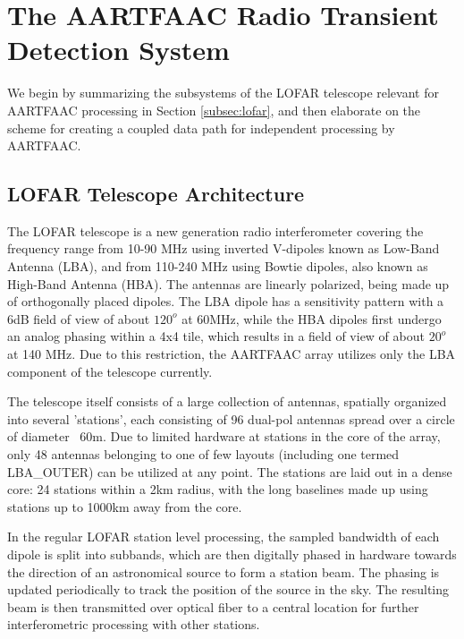 \documentclass{ws-jai}
\begin{document}
\section {\label{sec:aartfaac_array}The AARTFAAC Radio Transient Detection System}
We  begin by  summarizing the  subsystems of  the LOFAR  telescope relevant  for
AARTFAAC processing  in Section  \ref{subsec:lofar}, and  then elaborate  on the
scheme for creating a coupled data path for independent processing by AARTFAAC.

\subsection {\label{subsec:lofar} LOFAR Telescope Architecture}
The   LOFAR   telescope  \citep{van2013lofar}   is   a   new  generation   radio
interferometer  covering  the frequency  range  from  10-90 MHz  using  inverted
V-dipoles known  as Low-Band Antenna  (LBA), and  from 110-240 MHz  using Bowtie
dipoles,  also known  as High-Band  Antenna  (HBA).  The  antennas are  linearly
polarized, being made  up of orthogonally placed dipoles.  The  LBA dipole has a
sensitivity pattern with  a 6dB field of  view of about $120^o$  at 60MHz, while
the HBA dipoles first undergo an analog phasing within a 4x4 tile, which results
in a  field of view of  about $20^o$ at 140  MHz.  Due to this  restriction, the
AARTFAAC array utilizes only the LBA component of the telescope currently.

The  telescope itself  consists of  a  large collection  of antennas,  spatially
organized  into several  'stations',  each consisting  of  96 dual-pol  antennas
spread over a circle  of diameter ~60m.  Due to limited  hardware at stations in
the  core of  the  array, only  48  antennas  belonging to  one  of few  layouts
(including one  termed LBA\_OUTER) can be  utilized at any point.   The stations
are laid  out in a dense  core: 24 stations within  a 2km radius, with  the long
baselines made up using stations up to 1000km away from the core.

In the  regular LOFAR station  level processing,  the sampled bandwidth  of each
dipole  is split  into subbands,  which are  then digitally  phased in  hardware
towards the  direction of  an astronomical  source to form  a station  beam. The
phasing  is updated  periodically to  track the  position of  the source  in the
sky. The  resulting beam  is then  transmitted over optical  fiber to  a central
location for further interferometric processing with other stations.
\end{document}
